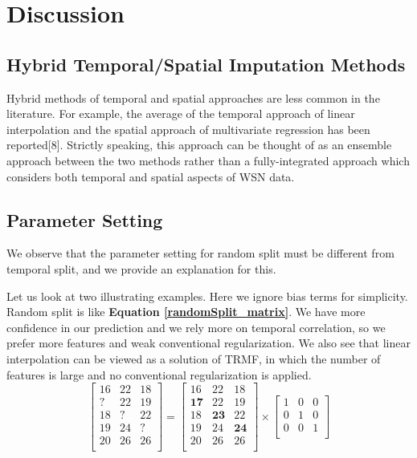 \section{Discussion}  \label{sec:disc}

\subsection{Hybrid Temporal/Spatial Imputation Methods}

Hybrid methods of temporal and spatial approaches are less common in the literature.
For example, the average of the temporal approach of linear interpolation and the spatial approach of multivariate regression has been reported[8].
Strictly speaking, this approach can be thought of as an ensemble approach between the two methods rather than a fully-integrated approach which considers both temporal and spatial aspects of WSN data.

\subsection{Parameter Setting} \label{subsec:parameter}

We observe that the parameter setting for random split must be different from temporal split, and we provide an explanation for this. 

Let us look at two illustrating examples. Here we ignore bias terms for simplicity. Random split is like \textbf{Equation \ref{randomSplit_matrix}}. We have more confidence in our prediction and we rely more on temporal correlation, so we prefer more features and weak conventional regularization. We also see that linear interpolation can be viewed as a solution of TRMF, in which the number of features is large and no conventional regularization is applied. 
\begin{equation}
\label{randomSplit_matrix}
\begin{bmatrix}
16 & 22 & 18\\
 ? & 22 & 19\\
18 &  ?	& 22\\
19 & 24 &  ?\\
20 & 26 & 26\\
\end{bmatrix} 
= 
\begin{bmatrix}
16 & 22 & 18\\
\mathbf{17} & 22 & 19\\
18 & \mathbf{23}	& 22\\
19 & 24 & \mathbf{24}\\
20 & 26 & 26\\
\end{bmatrix} 
\times
\begin{bmatrix}
1 & 0 & 0\\
0 & 1 & 0\\
0 & 0 & 1\\
\end{bmatrix} 
\end{equation}

